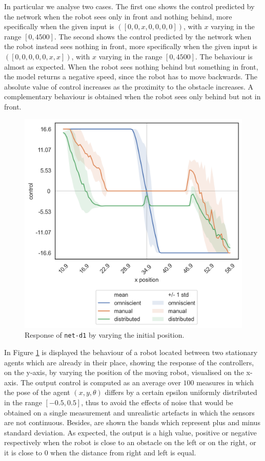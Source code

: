 In particular we analyse two cases. The first one shows the control predicted by 
the network when the robot sees only in front and nothing behind, more 
specifically when the given input is  $([0, 0, x, 0, 0, 0, 0])$, with $x$ varying in the 
range $[0, 4500]$.
The second shows the control predicted by the network when the robot instead 
sees nothing in front, more specifically when the given input is  $([0, 0, 0, 0, 0,x , 
x])$, with $x$ varying in the range $[0, 4500]$.
The behaviour is almost as expected. When the robot sees nothing behind but 
something in front, the model returns a negative speed, since the robot has to 
move backwards. 
The absolute value of control increases as the proximity to the obstacle increases.
A complementary behaviour is obtained when the robot sees only behind but 
not in front.

\begin{figure}[!htb]
	\centering
	\includegraphics[width=.45\textwidth]{contents/images/net-d1/response-varying_init_position-distributed}%
	\caption{Response of \texttt{net-d1} by varying the initial position.}
	\label{fig:net-d1responseposition}
\end{figure}
In Figure \ref{fig:net-d1responseposition} is displayed the behaviour of a robot 
located between two stationary agents which are already in their place, showing 
the response of the controllers, on the y-axis, by varying the position of the 
moving robot, visualised on the x-axis. The output control is computed as an 
average over $100$ measures in which the pose of the agent $(x, y, \theta)$ 
differs by a certain epsilon uniformly distributed in the range $[-0.5, 0.5]$, thus 
to avoid the effects of noise that would be obtained on a single measurement and 
unrealistic artefacts in which the sensors are not continuous. Besides, are shown 
the bands which represent plus and minus standard deviation. As expected, the 
output is a high value, positive or negative respectively when the robot is close to 
an obstacle on the left or on the right, or it is close to $0$ when the distance from 
right and left is equal.

